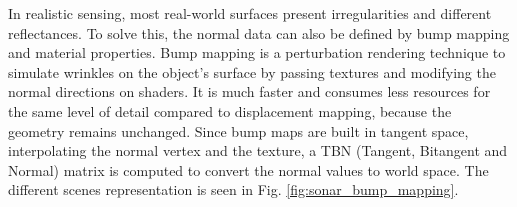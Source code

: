 \documentclass[final,5p,times]{elsarticle}
\begin{document}
In realistic sensing, most real-world surfaces present irregularities and different reflectances. To solve this, the normal data can also be defined by bump mapping and material properties. Bump mapping is a perturbation rendering technique to simulate wrinkles on the object's surface by passing textures and modifying the normal directions on shaders. It is much faster and consumes less resources for the same level of detail compared to displacement mapping, because the geometry remains unchanged. Since bump maps are built in tangent space, interpolating the normal vertex and the texture, a TBN (Tangent, Bitangent and Normal) matrix is computed to convert the normal values to world space. The different scenes representation is seen in Fig. \ref{fig:sonar_bump_mapping}.

\begin{figure}[t]
    \centering
    \subfigure[][]{
}
\end{figure}
\end{document}
